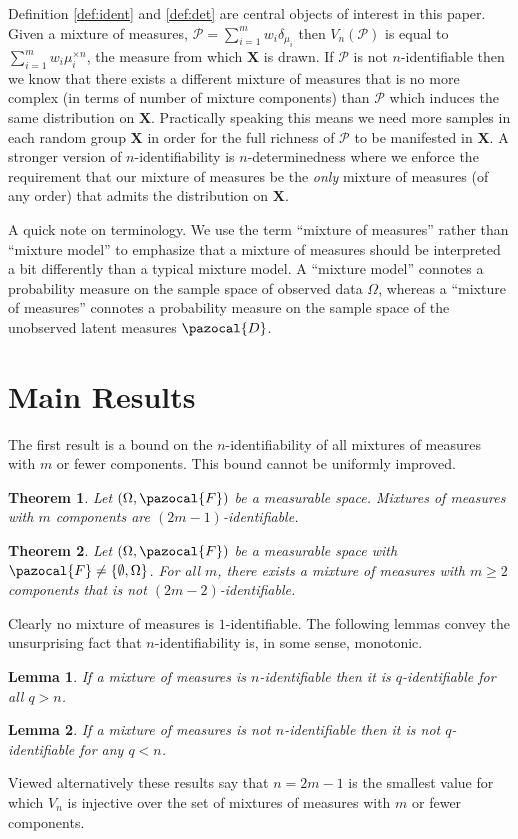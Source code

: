 \documentclass[aos,preprint]{imsart}
\def\sF{\pazocal{F}}
\def\sD{\pazocal{D}}
\def\sP{\mathscr{P}}
\def\bX{\mathbf{X}}
\theoremstyle{plain}
\newtheorem{thm}{Theorem}[section]
\newtheorem{lem}{Lemma}[section]
\theoremstyle{defintion}
\begin{document}
	Definition \ref{def:ident} and \ref{def:det} are central objects of interest in this paper. Given a mixture of measures, $\sP = \sum_{i=1}^m w_i\delta_{\mu_i}$ then $V_n(\sP)$ is equal to $\sum_{i=1}^m w_i \mu_i^{\times n}$, the measure from which $\bX$ is drawn. If $\sP$ is not $n$-identifiable then we know that there exists a different mixture of measures that is no more complex (in terms of number of mixture components) than $\sP$ which induces the same distribution on $\bX$. Practically speaking this means we need more samples in each random group $\bX$ in order for the full richness of $\sP$ to be manifested in $\bX$. A stronger version of $n$-identifiability is $n$-determinedness where we enforce the requirement that our mixture of measures be the {\em only} mixture of measures (of any order) that admits the distribution on $\bX$.
	
	A quick note on terminology. We use the term ``mixture of measures'' rather than ``mixture model'' to emphasize that a mixture of measures should be interpreted a bit differently than a typical mixture model. A ``mixture model'' connotes a probability measure on the sample space of observed data $\Omega$, whereas a ``mixture of measures'' connotes a probability measure on the sample space of the unobserved latent measures $\sD$.

	\section{Main Results}
	The first result is a bound on the $n$-identifiability of all mixtures of measures with $m$ or fewer components. This bound cannot be uniformly improved.
	\begin{thm} \label{thm:ident}
		Let $\left( \Omega,\sF \right)$ be a measurable space. Mixtures of measures with $m$ components are $(2m-1)$-identifiable.
	\end{thm}

	\begin{thm} \label{thm:noident}
		Let $\left( \Omega, \sF \right)$ be a measurable space with $\sF \neq \left\{ \emptyset,\Omega \right\}$. For all $m$, there exists a mixture of measures with $m\ge 2$ components that is not $(2m-2)$-identifiable.
	\end{thm}
	Clearly no mixture of measures is $1$-identifiable.
	The following lemmas convey the unsurprising fact that $n$-identifiability is, in some sense, monotonic.
	\begin{lem}\label{lem:ident} \sloppy
		If a mixture of measures is $n$-identifiable then it is $q$-identifiable for all $q>n$.
	\end{lem}
	\begin{lem} \label{lem:noident}
		If a mixture of measures is not $n$-identifiable then it is not $q$-identifiable for any $q<n$.
	\end{lem}
	Viewed alternatively these results say that $n=2m-1$ is the smallest value for which $V_{n}$ is injective over the set of mixtures of measures with $m$ or fewer components.
\end{document}
